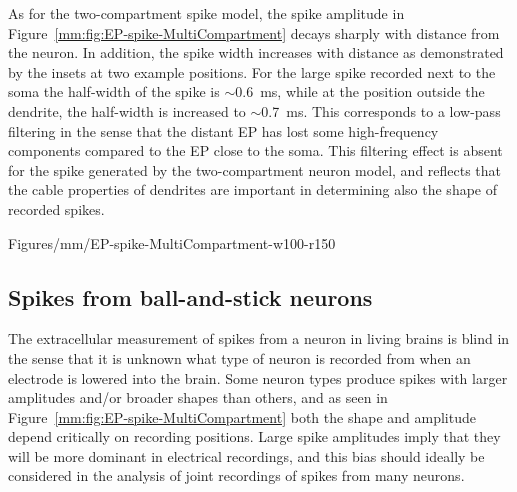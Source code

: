 As for the two-compartment spike model, the spike amplitude in Figure~\ref{mm:fig:EP-spike-MultiCompartment} 
decays sharply with distance from the neuron. In addition, the spike width increases
with distance as demonstrated by the insets at two example positions. For the large spike recorded next to
the soma the half-width of the spike is $\sim$0.6~ms, while at the position outside the dendrite, the half-width is increased to
$\sim$0.7~ms. This corresponds to a low-pass filtering in the sense that the distant EP has lost some 
high-frequency components compared to the EP close to the soma. This filtering effect is absent for the spike generated by the 
two-compartment neuron model, and reflects that the cable properties of dendrites are important in determining 
also the shape of recorded spikes.   

\begin{cnfigure}{Figures/mm/EP-spike-MultiCompartment-w100-r150}
\caption[]{EP (spike) from action potential for a multi-compartmental neuron model with active sodium
and potassium conductances in the soma compartment as computed from 
Equation~\ref{mm:equation:Ve-multi-compartment}.
Left panel shows the EP at different spatial positions, while right panel shows the corresponding
soma membrane potential during the action potential. 
}
\label{mm:fig:EP-spike-MultiCompartment}
\figpermOurs
\end{cnfigure}

\subsection{Spikes from ball-and-stick neurons}
\label{mm:sec:spike-widths-amplitudes}
The extracellular measurement of spikes from a neuron in living brains is blind in the sense that it is
unknown what type of neuron is recorded from when an electrode is lowered into the brain.
Some neuron types produce spikes with larger amplitudes and/or broader shapes than
others, and as seen in Figure~\ref{mm:fig:EP-spike-MultiCompartment} both the shape and amplitude 
depend critically on recording positions. Large spike amplitudes imply that they will be more dominant in electrical recordings,
and this bias should ideally be considered in the analysis of joint recordings 
of spikes from many neurons.

